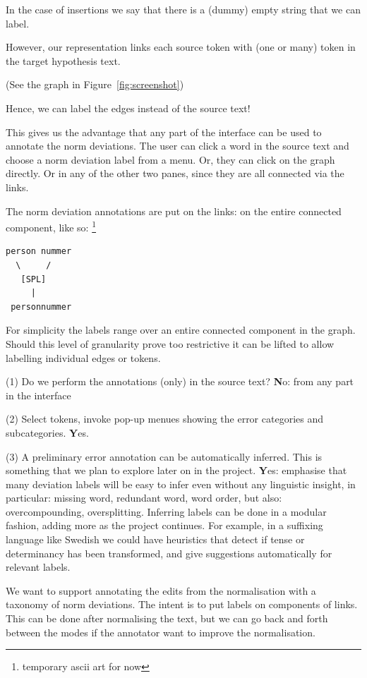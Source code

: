 \documentclass[10pt, a4paper]{article}
\begin{document}
In the case of insertions we say that there is
a (dummy) empty string that we can label.

However, our representation links each source token with (one or many)
token in the target hypothesis text.

(See the graph in Figure~\ref{fig:screenshot})

Hence, we can label the edges instead of the source text!

This gives us the advantage that any part of the interface
can be used to annotate the norm deviations.
The user can click a word in the source text and choose
a norm deviation label from a menu. Or, they can click
on the graph directly. Or in any of the other two panes,
since they are all connected via the links.

The norm deviation annotations are put on the links: on the entire connected component, like so:
\footnote{temporary ascii art for now}

\begin{verbatim}
person nummer
  \     /
   [SPL]
     |
 personnummer
\end{verbatim}

For simplicity the labels range over an entire connected
component in the graph.
Should this level of granularity prove too restrictive
it can be lifted to allow labelling individual edges or tokens.

(1) Do we perform the annotations (only) in the source text?
{\textbf No:} from any part in the interface

(2) Select tokens, invoke pop-up menues showing the error categories and
subcategories.
{\textbf Yes.}

(3) A preliminary error annotation can be automatically inferred. This is
something that we plan to explore later on in the project.
{\textbf Yes:} emphasise that many deviation labels will be easy to infer
even without any linguistic insight,
in particular: missing word, redundant word, word order,
but also: overcompounding, oversplitting.
Inferring labels can be done in a modular fashion, adding more as the
project continues.
For example, in a suffixing language like Swedish we could have heuristics
that detect if tense or determinancy has been transformed, and give
suggestions automatically for relevant labels.

We want to support annotating the edits from the normalisation with a taxonomy
of norm deviations.  The intent is to put labels on components of links.
This can be done after normalising the text, but we can go back and forth
between the modes if the annotator want to improve the normalisation.
\end{document}
